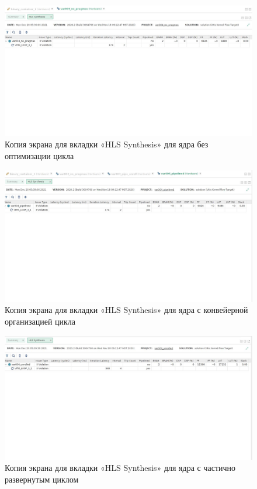 \documentclass[12pt]{report}
\begin{document}
\begin{figure}[h!p]
	\centering
	\includegraphics[width = \linewidth]{syn_no_pragmas.png}
	\caption{Копия экрана для вкладки «HLS Synthesis» для ядра без оптимизации цикла}
	\label{img:syn_no_pragmas}
\end{figure}
\begin{figure}[h!p]
	\centering
	\includegraphics[width = \linewidth]{syn_pipelined.png}
	\caption{Копия экрана для вкладки «HLS Synthesis» для ядра с конвейерной организацией цикла}
	\label{img:syn_pipelined}
\end{figure}
\begin{figure}[h!p]
	\centering
	\includegraphics[width = \linewidth]{syn_unrolled.png}
	\caption{Копия экрана для вкладки «HLS Synthesis» для ядра с частично развернутым циклом}
	\label{img:syn_unrolled}
\end{figure}
\end{document}
